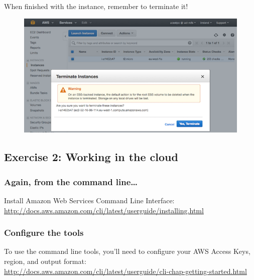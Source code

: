 When finished with the instance, remember to terminate it!

\begin{figure}[htbp]
\centering
\includegraphics{96Cloud/figures/terminate_instance.png}
\end{figure}

\subsection{Exercise 2: Working in the
cloud}\label{exercise-2-working-in-the-cloud}

\subsubsection{Again, from the command
line\ldots{}}\label{again-from-the-command-line}

Install Amazon Web Services Command Line
Interface:\\\url{http://docs.aws.amazon.com/cli/latest/userguide/installing.html}

\begin{Shaded}
\begin{Highlighting}[]
 
 
\end{Highlighting}
\end{Shaded}

\subsubsection{Configure the tools}\label{configure-the-tools}

To use the command line tools, you'll need to configure your AWS Access
Keys, region, and output
format:\\\url{http://docs.aws.amazon.com/cli/latest/userguide/cli-chap-getting-started.html}

